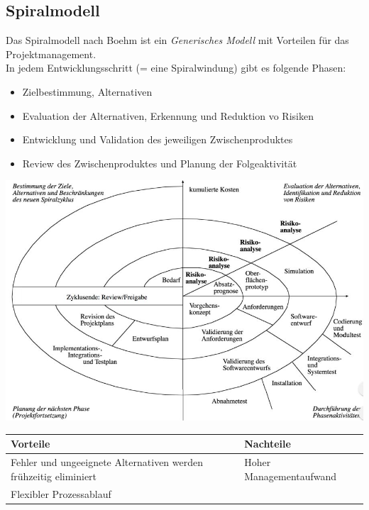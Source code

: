 \documentclass[a4paper,12pt]{article}
\begin{document}
	\subsection*{Spiralmodell}
	Das Spiralmodell nach Boehm ist ein \textit{Generisches Modell} mit Vorteilen für das Projektmanagement.\\
	In jedem Entwicklungsschritt (= eine Spiralwindung) gibt es folgende Phasen:
	\begin{itemize}
		\item Zielbestimmung, Alternativen
		\item Evaluation der Alternativen, Erkennung und Reduktion vo Risiken
		\item Entwicklung und Validation des jeweiligen Zwischenproduktes
		\item Review des Zwischenproduktes und Planung der Folgeaktivität
	\end{itemize}
	\begin{center}
		\includegraphics[width=\linewidth]{pics/spiralmodell.jpg}
	\end{center}
	\begin{center}
		\begin{tabularx}{13cm}{X|X}
			\hline 
			Vorteile & Nachteile\\ \hline \hline
			Fehler und ungeeignete Alternativen werden frühzeitig eliminiert & Hoher Managementaufwand \\ \hline
			Flexibler Prozessablauf & 
		\end{tabularx}
	\end{center}
\end{document}
